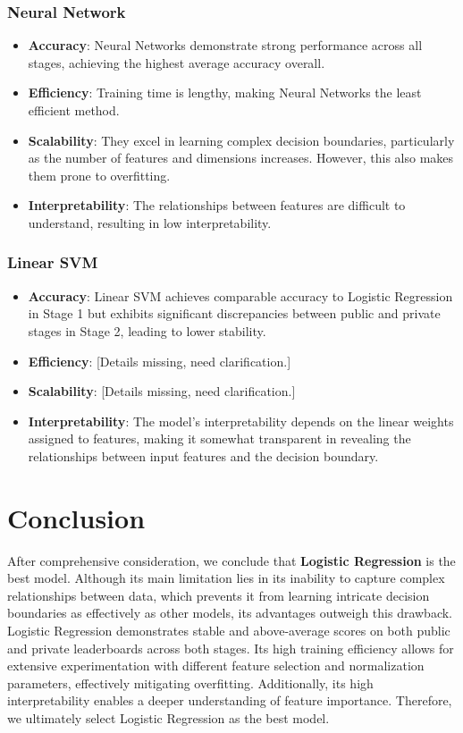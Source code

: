 \documentclass[12pt,a4paper]{article}
\begin{document}
\subsubsection*{Neural Network}
\begin{itemize}
    \item \textbf{Accuracy}: Neural Networks demonstrate strong performance across all stages, achieving the highest average accuracy overall.
    \item \textbf{Efficiency}: Training time is lengthy, making Neural Networks the least efficient method.
    \item \textbf{Scalability}: They excel in learning complex decision boundaries, particularly as the number of features and dimensions increases. However, this also makes them prone to overfitting.
    \item \textbf{Interpretability}: The relationships between features are difficult to understand, resulting in low interpretability.
\end{itemize}

\subsubsection*{Linear SVM}
\begin{itemize}
    \item \textbf{Accuracy}: Linear SVM achieves comparable accuracy to Logistic Regression in Stage 1 but exhibits significant discrepancies between public and private stages in Stage 2, leading to lower stability.
    \item \textbf{Efficiency}: [Details missing, need clarification.]
    \item \textbf{Scalability}: [Details missing, need clarification.]
    \item \textbf{Interpretability}: The model's interpretability depends on the linear weights assigned to features, making it somewhat transparent in revealing the relationships between input features and the decision boundary.
\end{itemize}

\section*{Conclusion}

After comprehensive consideration, we conclude that \textbf{Logistic Regression} is the best model. Although its main limitation lies in its inability to capture complex relationships between data, which prevents it from learning intricate decision boundaries as effectively as other models, its advantages outweigh this drawback. Logistic Regression demonstrates stable and above-average scores on both public and private leaderboards across both stages. Its high training efficiency allows for extensive experimentation with different feature selection and normalization parameters, effectively mitigating overfitting. Additionally, its high interpretability enables a deeper understanding of feature importance. Therefore, we ultimately select Logistic Regression as the best model.
\end{document}
